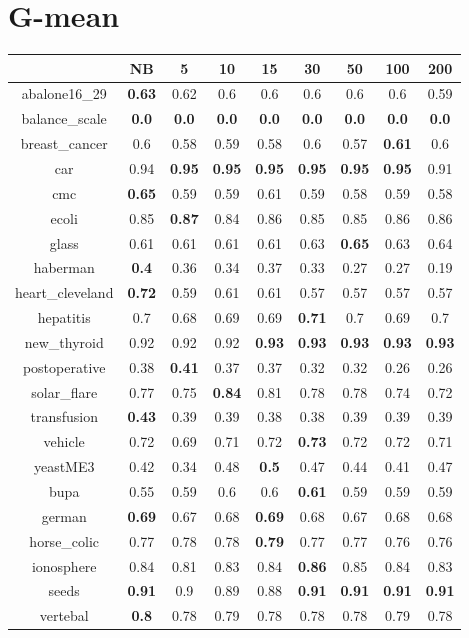 \documentclass{article}%
\begin{document}
%
\section*{G{-}mean}%
\begin{tabular}{c|cccccccc}%
\hline%
&NB&5&10&15&30&50&100&200\\%
\hline%
abalone16\_29&\textbf{0.63}&0.62&0.6&0.6&0.6&0.6&0.6&0.59\\%
\hline%
balance\_scale&\textbf{0.0}&\textbf{0.0}&\textbf{0.0}&\textbf{0.0}&\textbf{0.0}&\textbf{0.0}&\textbf{0.0}&\textbf{0.0}\\%
\hline%
breast\_cancer&0.6&0.58&0.59&0.58&0.6&0.57&\textbf{0.61}&0.6\\%
\hline%
car&0.94&\textbf{0.95}&\textbf{0.95}&\textbf{0.95}&\textbf{0.95}&\textbf{0.95}&\textbf{0.95}&0.91\\%
\hline%
cmc&\textbf{0.65}&0.59&0.59&0.61&0.59&0.58&0.59&0.58\\%
\hline%
ecoli&0.85&\textbf{0.87}&0.84&0.86&0.85&0.85&0.86&0.86\\%
\hline%
glass&0.61&0.61&0.61&0.61&0.63&\textbf{0.65}&0.63&0.64\\%
\hline%
haberman&\textbf{0.4}&0.36&0.34&0.37&0.33&0.27&0.27&0.19\\%
\hline%
heart\_cleveland&\textbf{0.72}&0.59&0.61&0.61&0.57&0.57&0.57&0.57\\%
\hline%
hepatitis&0.7&0.68&0.69&0.69&\textbf{0.71}&0.7&0.69&0.7\\%
\hline%
new\_thyroid&0.92&0.92&0.92&\textbf{0.93}&\textbf{0.93}&\textbf{0.93}&\textbf{0.93}&\textbf{0.93}\\%
\hline%
postoperative&0.38&\textbf{0.41}&0.37&0.37&0.32&0.32&0.26&0.26\\%
\hline%
solar\_flare&0.77&0.75&\textbf{0.84}&0.81&0.78&0.78&0.74&0.72\\%
\hline%
transfusion&\textbf{0.43}&0.39&0.39&0.38&0.38&0.39&0.39&0.39\\%
\hline%
vehicle&0.72&0.69&0.71&0.72&\textbf{0.73}&0.72&0.72&0.71\\%
\hline%
yeastME3&0.42&0.34&0.48&\textbf{0.5}&0.47&0.44&0.41&0.47\\%
\hline%
bupa&0.55&0.59&0.6&0.6&\textbf{0.61}&0.59&0.59&0.59\\%
\hline%
german&\textbf{0.69}&0.67&0.68&\textbf{0.69}&0.68&0.67&0.68&0.68\\%
\hline%
horse\_colic&0.77&0.78&0.78&\textbf{0.79}&0.77&0.77&0.76&0.76\\%
\hline%
ionosphere&0.84&0.81&0.83&0.84&\textbf{0.86}&0.85&0.84&0.83\\%
\hline%
seeds&\textbf{0.91}&0.9&0.89&0.88&\textbf{0.91}&\textbf{0.91}&\textbf{0.91}&\textbf{0.91}\\%
\hline%
vertebal&\textbf{0.8}&0.78&0.79&0.78&0.78&0.78&0.79&0.78\\%
\hline%
\end{tabular}

%
\end{document}
